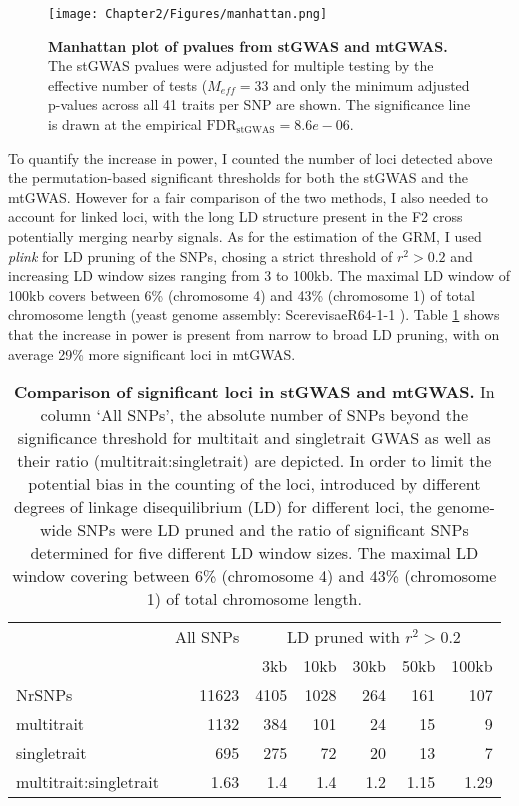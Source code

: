 \begin{figure}[hbtp]
	\centering
	\texttt{[image: Chapter2/Figures/manhattan.png]}
	\caption{\textbf{Manhattan plot of pvalues from stGWAS and mtGWAS.} The stGWAS pvalues were adjusted for multiple testing by the effective number of tests (\(M_{eff} = 33\) and only the minimum adjusted p-values across all 41 traits per SNP are shown. The significance line is drawn at the empirical \(\text{FDR}_{\text{stGWAS}} =8.6e-06\).}
 	\label{fig:GWAS-yeast}
\end{figure}

To quantify the increase in power, I counted the number of loci detected above the permutation-based significant thresholds for both the stGWAS and the mtGWAS. However for a fair comparison of the two methods, I also needed to account for linked loci, with the long LD structure present in the F2 cross potentially merging nearby signals. As for the estimation of the GRM, I used \textit{plink} for LD pruning of the SNPs, chosing a strict threshold of \(r^2 > 0.2\) and increasing LD window sizes ranging from 3 to 100kb.  The maximal LD window of 100kb covers between 6\% (chromosome 4) and 43\% (chromosome 1) of total chromosome length (yeast genome assembly: ScerevisaeR64-1-1 \red{\citep{}}). Table \ref{tab:sigsnps} shows that the increase in power is present from narrow to broad LD pruning, with on average 29\% more significant loci in mtGWAS.

\begin{table}[htbp]
  \centering
  \caption{\textbf{Comparison of significant loci in stGWAS and mtGWAS.} In column `All SNPs', the absolute number of SNPs beyond the significance threshold for multitait and singletrait GWAS as well as their ratio (multitrait:singletrait) are depicted. In order to limit the potential bias in the counting of the loci, introduced by different degrees of linkage disequilibrium (LD) for different loci, the genome-wide SNPs were LD pruned and the ratio of significant SNPs determined for five different LD window sizes. The maximal LD window covering between 6\% (chromosome 4) and 43\% (chromosome 1) of total chromosome length.}
    \begin{tabular}{lrrrrrr}
    \toprule
          & \multicolumn{1}{c}{All SNPs} & \multicolumn{5}{c}{LD pruned with $r^2 > 0.2$ } \\
\cmidrule{3-7}          &       & 3kb   & 10kb  & 30kb  & 50kb  & 100kb \\
    \midrule
    NrSNPs & 11623 & 4105  & 1028  & 264   & 161   & 107 \\
    multitrait & 1132  & 384   & 101   & 24    & 15    & 9 \\
    singletrait & 695   & 275   & 72    & 20    & 13    & 7 \\
    multitrait:singletrait & 1.63  & 1.4   & 1.4   & 1.2   & 1.15  & 1.29 \\
    \bottomrule
    \end{tabular}%
  \label{tab:sigsnps}%
\end{table}%


